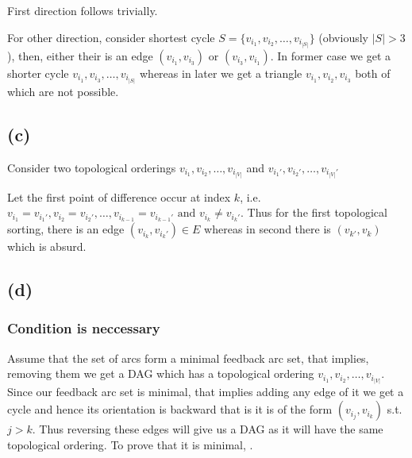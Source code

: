 \documentclass[12pt,3p]{elsarticle}
\begin{document}
First direction follows trivially.

For other direction, consider shortest cycle $S = \{v_{i_1}, v_{i_2}, \dots, v_{i_{|S|}}\}$ (obviously $|S| > 3$), then, either their is an edge $(v_{i_1}, v_{i_3}) \text{ or } (v_{i_3}, v_{i_1})$. In former case we get a shorter cycle $v_{i_1}, v_{i_3}, \dots, v_{i_{|S|}}$ whereas in later we get a triangle $v_{i_1}, v_{i_2}, v_{i_3}$ both of which are not possible.

\subsection{(c)}

Consider two topological orderings $v_{i_1}, v_{i_2}, \dots, v_{i_{|V|}}$ and $v_{i_1'}, v_{i_2'}, \dots, v_{i_{|V|}'}$ 

Let the first point of difference occur at index $k$, i.e. $v_{i_1} = v_{i_1'}, v_{i_2} = v_{i_2'}, \dots, v_{i_{k - 1}} = v_{i_{k - 1}'} \text{ and } v_{i_k} \neq v_{i_k'}$. Thus for the first topological sorting, there is an edge $(v_{i_k}, v_{i_k'}) \in E$ whereas in second there is $(v_{k'}, v_{k})$ which is absurd.

\subsection{(d)}

\subsubsection{Condition is neccessary}

Assume that the set of arcs form a minimal feedback arc set, that implies, removing them we get a DAG which has a topological ordering $v_{i_1}, v_{i_2}, \dots, v_{i_{|V|}}$. Since our feedback arc set is minimal, that implies adding any edge of it we get a cycle and hence its orientation is backward that is it is of the form $(v_{i_j}, v_{i_k})$ s.t. $j > k$. Thus reversing these edges will give us a DAG as it will have the same topological ordering. To prove that it is minimal, .
\end{document}
